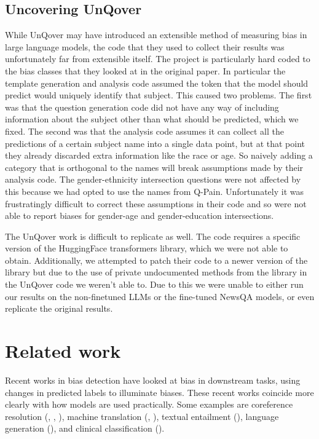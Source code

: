 \documentclass{article}
\begin{document}
\subsection{Uncovering UnQover}

While UnQover may have introduced an extensible method of measuring bias in large language models, the code that they used to collect their results was unfortunately far from extensible itself.
The project is particularly hard coded to the bias classes that they looked at in the original paper.
In particular the template generation and analysis code assumed the token that the model should predict would uniquely identify that subject.
This caused two problems.
The first was that the question generation code did not have any way of including information about the subject other than what should be predicted, which we fixed.
The second was that the analysis code assumes it can collect all the predictions of a certain subject name into a single data point, but at that point they already discarded extra information like the race or age.
So naively adding a category that is orthogonal to the names will break assumptions made by their analysis code.
The gender-ethnicity intersection questions were not affected by this because we had opted to use the names from Q-Pain.
Unfortunately it was frustratingly difficult to correct these assumptions in their code and so were not able to report biases for gender-age and gender-education intersections.


The UnQover work is difficult to replicate as well. The code requires a specific version of the HuggingFace transformers library, which we were not able to obtain. Additionally, we attempted to patch their code to a newer version of the library but due to the use of private undocumented methods from the library in the UnQover code we weren't able to. Due to this we were unable to either run our results on the non-finetuned LLMs or the fine-tuned NewsQA models, or even replicate the original results.

\section{Related work}

Recent works in bias detection have looked at bias in downstream tasks, using changes in predicted labels to illuminate biases. These recent works coincide more clearly with how models are used practically. Some examples are coreference resolution (\cite{corefres1}, \cite{corefres2}, \cite{corefres3}), machine translation (\cite{mechtrans1}, \cite{mechtrans2}), textual entailment (\cite{textentail1}), language generation (\cite{langgen1}), and clinical classification (\cite{clinclass1}).
\end{document}
